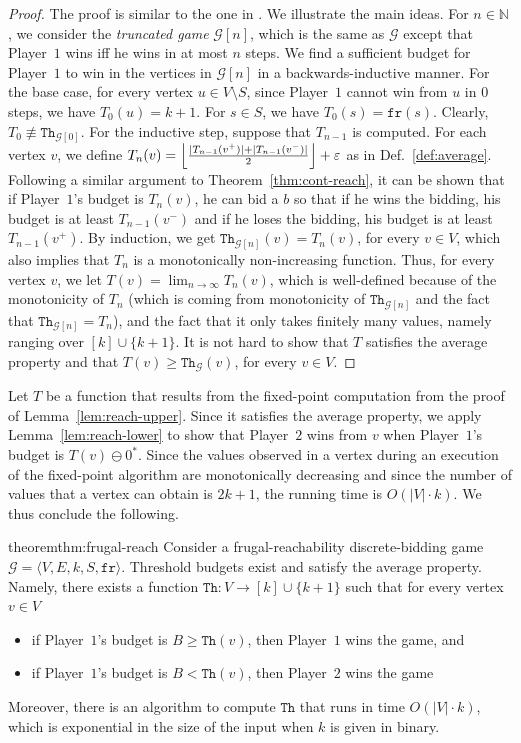 \documentclass{theoretics}
\newcommand{\PO}{Player~$1$\xspace}
\newcommand{\PT}{Player~$2$\xspace}
\newcommand{\G}{{\mathcal G}}
\newcommand{\fr}{\texttt{fr}}
\newcommand{\Nat}{\mathbb{N}}
\newcommand{\thresh}{\texttt{Th}\xspace}
\newcommand{\zug}[1]{\langle #1  \rangle}
\newcommand{\predb}[1]{#1 \ominus 0^*\xspace}
\newcommand{\eps}{\varepsilon}
\DeclarePairedDelimiter{\adjustfloor}{\lfloor}{\rfloor}
\newcommand{\floor}[1]{\adjustfloor*{#1}}
\begin{document}
\begin{proof}
	
	The proof is similar to the one in \cite{DP10}. We illustrate the main ideas. For $n \in \Nat$, we consider the {\em truncated game} $\G[n]$, which is the same as $\G$ except that \PO wins iff he wins in at most $n$ steps. We find a sufficient budget for \PO to win in the vertices in $\G[n]$ in a backwards-inductive manner. For the base case, for every vertex $u \in V \setminus S$, since \PO cannot win from $u$ in $0$ steps, we have $T_0(u) = k+1$. For $s \in S$, we have $T_0(s) = \fr(s)$. Clearly, $T_0 \nequiv \thresh_{\G[0]}$. For the inductive step, suppose that $T_{n-1}$ is computed. For each vertex $v$, we define $T_n(v) = \floor{\frac{|T_{n-1}(v^+)| + |T_{n-1}(v^-)|}{2}} +\eps$ as in Def.~\ref{def:average}. Following a similar argument to Theorem~\ref{thm:cont-reach}, it can be shown that if \PO's budget is $T_n(v)$, he can bid a $b$ so that if he wins the bidding, his budget is at least $T_{n-1}(v^-)$ and if he loses the bidding, his budget is at least $T_{n-1}(v^+)$. By induction, we get $\thresh_{\G[n]}(v) = T_{n}(v)$, for every $v \in V$, which also implies that \(T_n\) is a monotonically non-increasing function. Thus, for every vertex $v$, we let $T(v) = \lim_{n \to \infty} T_n(v)$, which is well-defined because of the monotonicity of \(T_n\) (which is coming from monotonicity of \(\thresh_{\G[n]}\) and the fact that \(\thresh_{\G[n]} = T_n\)), and the fact that it only takes finitely many values, namely ranging over \([k] \cup \{k+1\}\).
	It is not hard to show that $T$ satisfies the average property and that $T(v) \geq \thresh_\G(v)$, for every $v \in V$. 
\end{proof}


Let $T$ be a function that results from the fixed-point computation from the proof of Lemma~\ref{lem:reach-upper}. Since it satisfies the average property, we apply Lemma~\ref{lem:reach-lower} to show that \PT wins from $v$ when \PO's budget is $\predb{T(v)}$. 
Since the values observed in a vertex during an execution of the fixed-point algorithm are monotonically decreasing and since the number of values that a vertex can obtain is $2k +1$, the running time is $O(|V| \cdot k)$. 
We thus conclude the following. 



\begin{restatable}{theorem}{thm:frugal-reach}
	\label{thm:frugal-reach}
	Consider a frugal-reachability discrete-bidding game \(\G = \zug{V, E, k, S, \fr}\). Threshold budgets exist and satisfy the average property. Namely, there exists a function \(\thresh: V \rightarrow [k] \cup \{k+1\}\) such that for every vertex $v \in V$ 
	\begin{itemize}
		\item if \PO's budget is $B \geq \thresh(v)$, then \PO wins the game, and
		\item if \PO's budget is $B < \thresh(v)$, then \PT wins the game
	\end{itemize}
	Moreover, there is an algorithm to compute $\thresh$ that runs in time $O(|V| \cdot k)$, which is exponential in the size of the input when $k$ is given in binary.
\end{restatable}
\end{document}
